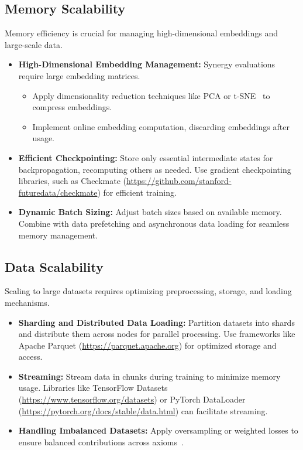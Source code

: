 \subsection{Memory Scalability}
Memory efficiency is crucial for managing high-dimensional embeddings and large-scale data.

\begin{itemize}
    \item \textbf{High-Dimensional Embedding Management:}
    Synergy evaluations require large embedding matrices.
    \begin{itemize}
        \item Apply dimensionality reduction techniques like PCA or t-SNE~\cite{maaten2008visualizing} to compress embeddings.
        \item Implement online embedding computation, discarding embeddings after usage.
    \end{itemize}

    \item \textbf{Efficient Checkpointing:}
    Store only essential intermediate states for backpropagation, recomputing others as needed.
    Use gradient checkpointing libraries, such as Checkmate (\url{https://github.com/stanford-futuredata/checkmate}) for efficient training.

    \item \textbf{Dynamic Batch Sizing:}
    Adjust batch sizes based on available memory. Combine with data prefetching and asynchronous data loading for seamless memory management.
\end{itemize}

\subsection{Data Scalability}
Scaling to large datasets requires optimizing preprocessing, storage, and loading mechanisms.

\begin{itemize}
    \item \textbf{Sharding and Distributed Data Loading:}
    Partition datasets into shards and distribute them across nodes for parallel processing. Use frameworks like Apache Parquet (\url{https://parquet.apache.org}) for optimized storage and access.

    \item \textbf{Streaming:}
    Stream data in chunks during training to minimize memory usage. Libraries like TensorFlow Datasets (\url{https://www.tensorflow.org/datasets}) or PyTorch DataLoader (\url{https://pytorch.org/docs/stable/data.html}) can facilitate streaming.

    \item \textbf{Handling Imbalanced Datasets:}
    Apply oversampling or weighted losses to ensure balanced contributions across axioms~\cite{buda2018systematic}.
\end{itemize}

